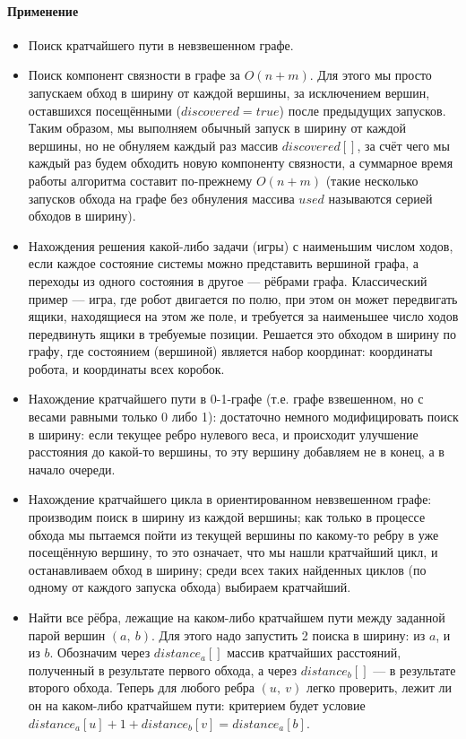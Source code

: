 \documentclass[a4paper,12pt]{article}
\begin{document}
\paragraph{Применение}
\begin{itemize}
    \item Поиск кратчайшего пути в невзвешенном графе.
    \item Поиск компонент связности в графе за $O(n+m)$. Для этого мы просто запускаем обход в ширину от каждой вершины, за исключением вершин, оставшихся посещёнными ($discovered=true$) после предыдущих запусков. Таким образом, мы выполняем обычный запуск в ширину от каждой вершины, но не обнуляем каждый раз массив $discovered[]$, за счёт чего мы каждый раз будем обходить новую компоненту связности, а суммарное время работы алгоритма составит по-прежнему $O(n+m)$ (такие несколько запусков обхода на графе без обнуления массива $used$ называются серией обходов в ширину).
    \item Нахождения решения какой-либо задачи (игры) с наименьшим числом ходов, если каждое состояние системы можно представить вершиной графа, а переходы из одного состояния в другое — рёбрами графа. Классический пример — игра, где робот двигается по полю, при этом он может передвигать ящики, находящиеся на этом же поле, и требуется за наименьшее число ходов передвинуть ящики в требуемые позиции. Решается это обходом в ширину по графу, где состоянием (вершиной) является набор координат: координаты робота, и координаты всех коробок.
    \item Нахождение кратчайшего пути в 0-1-графе (т.е. графе взвешенном, но с весами равными только 0 либо 1): достаточно немного модифицировать поиск в ширину: если текущее ребро нулевого веса, и происходит улучшение расстояния до какой-то вершины, то эту вершину добавляем не в конец, а в начало очереди.
    \item Нахождение кратчайшего цикла в ориентированном невзвешенном графе: производим поиск в ширину из каждой вершины; как только в процессе обхода мы пытаемся пойти из текущей вершины по какому-то ребру в уже посещённую вершину, то это означает, что мы нашли кратчайший цикл, и останавливаем обход в ширину; среди всех таких найденных циклов (по одному от каждого запуска обхода) выбираем кратчайший.
    \item Найти все рёбра, лежащие на каком-либо кратчайшем пути между заданной парой вершин $(a,\ b)$. Для этого надо запустить 2 поиска в ширину: из $a$, и из $b$. Обозначим через $distance_a[]$ массив кратчайших расстояний, полученный в результате первого обхода, а через $distance_b[]$ — в результате второго обхода. Теперь для любого ребра $(u,\ v)$ легко проверить, лежит ли он на каком-либо кратчайшем пути: критерием будет условие $distance_a[u] + 1 + distance_b[v] = distance_a[b]$.
\end{itemize}
\end{document}

